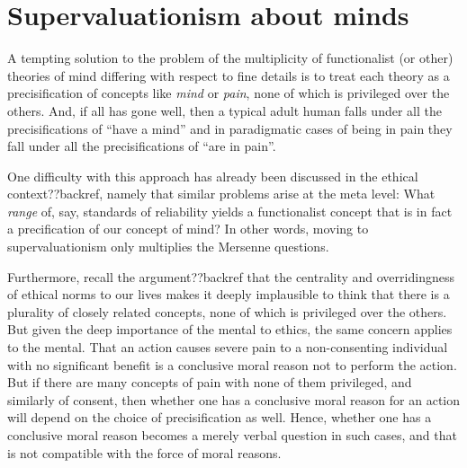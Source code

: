 \section{Supervaluationism about minds}
A tempting solution to the problem of the multiplicity of functionalist (or other) theories of mind differing with respect
to fine details is to treat each theory as a precisification of concepts like \textit{mind} or \textit{pain}, none of which
is privileged over the others. And,
if all has gone well, then a typical adult human falls under all the precisifications of ``have a mind'' and in paradigmatic cases of being in pain they fall under all the precisifications of ``are in pain''. 

One difficulty with this approach has already been discussed in the ethical context??backref, namely that similar problems
arise at the meta level: What \textit{range} of, say, standards of reliability yields a functionalist concept that is in fact a 
precification of our concept of mind? In other words, moving to supervaluationism only multiplies the Mersenne
questions.

Furthermore, recall the argument??backref that the centrality and overridingness of ethical norms to our lives makes it 
deeply implausible to think that there is a plurality of closely related concepts, none of which is privileged over the others.
But given the deep importance of the mental to ethics, the same concern applies to the mental. That an action causes severe
pain to a non-consenting individual with no significant benefit is a conclusive moral reason not to perform the action. 
But if there are many concepts of pain with none of them privileged, and similarly of consent, then whether one has a
conclusive moral reason for an action will depend on the choice of precisification as well. Hence, whether one has a 
conclusive moral reason becomes a merely verbal question in such cases, and that is not compatible with the force of moral
reasons.

